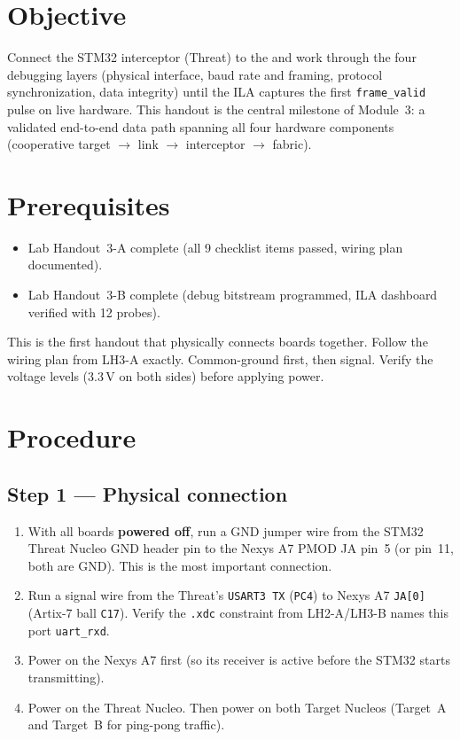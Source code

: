 \documentclass[11pt,letterpaper]{article}
\begin{document}

\section{Objective}
Connect the STM32 interceptor (Threat) to the \FPGA{} and work through the four debugging layers (physical interface, baud rate and framing, protocol synchronization, data integrity) until the \mbox{ILA{}} captures the first \texttt{frame\_valid} pulse on live hardware. This handout is the central milestone of Module~3: a validated end-to-end data path spanning all four hardware components (cooperative target \MCU{} $\to$ \RF{} link $\to$ interceptor \MCU{} $\to$ \FPGA{} fabric).

\section{Prerequisites}
\begin{itemize}[leftmargin=2em]
	\item Lab Handout~3-A complete (all 9 checklist items passed, wiring plan documented).
	\item Lab Handout~3-B complete (debug bitstream programmed, \mbox{ILA{}} dashboard verified with 12 probes).
\end{itemize}

\begin{tcolorbox}[warning={Make Connections Now}]
	This is the first handout that physically connects boards together. Follow the wiring plan from LH3-A exactly. Common-ground first, then signal. Verify the voltage levels (3.3\,V on both sides) before applying power.
\end{tcolorbox}

\section{Procedure}

\subsection{Step 1 --- Physical connection}
\begin{enumerate}[leftmargin=2em]
	\item With all boards \textbf{powered off}, run a GND jumper wire from the STM32 Threat Nucleo GND header pin to the Nexys A7 PMOD JA pin~5 (or pin~11, both are GND). This is the most important connection.
	\item Run a signal wire from the Threat's \texttt{USART3 TX} (\texttt{PC4}) to Nexys A7 \texttt{JA[0]} (Artix-7 ball \texttt{C17}). Verify the \texttt{.xdc} constraint from LH2-A/LH3-B names this port \texttt{uart\_rxd}.
	\item Power on the Nexys A7 first (so its \UART{} receiver is active before the STM32 starts transmitting).
	\item Power on the Threat Nucleo. Then power on both Target Nucleos (Target~A and Target~B for ping-pong traffic).
\end{enumerate}
\end{document}
